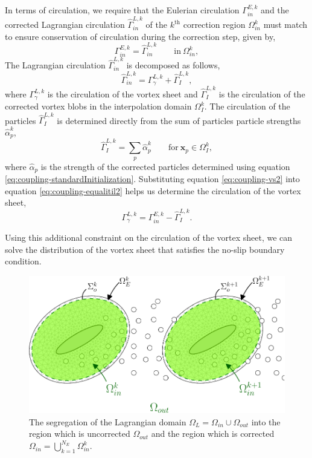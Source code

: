 	In terms of circulation, we require that the Eulerian circulation $\Gamma_{in}^{E,k}$ and the corrected Lagrangian circulation $\hat{\Gamma}_{in}^{L,k}$ of the $k^{\mathrm{th}}$ correction region $\Omega_{in}^k$ must match to ensure conservation of circulation during the correction step, given by,
		\begin{equation}
		\Gamma_{in}^{E,k} = \hat{\Gamma}_{in}^{L,k} \qquad \mathrm{in}\ \Omega_{in}^k,
		\label{eq:coupling-equalitil2}
		\end{equation}	
	The Lagrangian circulation $\hat{\Gamma}_{in}^{L,k}$ is decomposed as follows,
		\begin{equation}
		\hat{\Gamma}_{in}^{L,k} = \Gamma_{\gamma}^{L,k} + \hat{\Gamma}_{I}^{L,k},
		\label{eq:coupling-vs2}
		\end{equation}
	where $\Gamma_{\gamma}^{L,k}$ is the circulation of the vortex sheet and  $\hat{\Gamma}_{I}^{L,k}$ is the circulation of the corrected vortex blobs in the interpolation domain $\Omega_I^k$. The circulation of the particles $\hat{\Gamma}_{I}^{L,k}$ is determined directly from the sum of particles particle strengths $\hat{\alpha}_p^k$,
		\begin{equation}
		\hat{\Gamma}_{I}^{L,k} = \sum\limits_{p} \hat{\alpha}_p^k \qquad \mathrm{for}\ \mathbf{x}_p\in\Omega_I^k,
		\label{eq:coupling-sumparticlestrengths}
		\end{equation}
	where $\hat{\alpha}_p$ is the strength of the corrected particles determined using equation 		\ref{eq:coupling-standardInitialization}. Substituting equation \ref{eq:coupling-vs2} into equation \ref{eq:coupling-equalitil2} helps us determine the circulation of the vortex sheet,
		\begin{equation}
		\Gamma_{\gamma}^{L,k} = \Gamma_{in}^{E,k} - \hat{\Gamma}_{I}^{L,k}.
		\label{eq:coupling-panelstrength}
		\end{equation} 
	
	Using this additional constraint on the circulation of the vortex sheet, we can solve the distribution of the vortex sheet that satisfies the no-slip boundary condition.
	
		\begin{figure}[!t]
		\centering
		\includegraphics[width=0.9\linewidth]{./figures/coupling/modifiedDomain/domainDecomposition_correctionDomains-crop.pdf}
		\caption{The segregation of the Lagrangian domain $\Omega_L=\Omega_{in}\cup\Omega_{out}$ into the region which is uncorrected $\Omega_{out}$ and the region which is corrected $\Omega_{in} = \bigcup_{k=1}^{N_E}\Omega_{in}^k$.}
		\label{fig:domainDecomposition_correctionDomains}
		\end{figure}				
				
